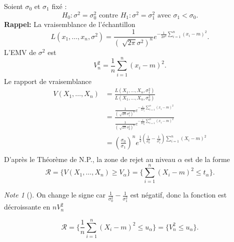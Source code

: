 \documentclass{article}
\theoremstyle{plain}%
\theoremstyle{definition}
\theoremstyle{remark}
\newtheorem*{note}{Note}
\begin{document}
Soient $ \sigma _0 $ et $ \sigma _1 $ fixé : 
\[
    H_0: \sigma ^2 = \sigma _0 ^2 \text{ contre } H_1 : \sigma ^2 = \sigma _1 ^2 \text{ avec } \sigma _1 < \sigma _0
.\]
\textbf{Rappel: }La vraisemblance de l'échantillon 
\[
    L(x_1, \dots, x_n, \sigma ^2) = \frac{1}{(\sqrt[]{2 \pi } \sigma ^2)^{n}} e^{- \frac{1}{2 \sigma ^2} \sum_{i=1}^{n}(x_i - m)^2}
.\]
L'EMV de $ \sigma ^2 $ est 
\[
    V_n^2 = \frac{1}{n}\sum_{i=1}^{n}(x_i - m)^2
.\]
Le rapport de vraisemblance 
\begin{align*}
    V(X_1, \dots, X_n) &= \frac{L(X_1, \dots, X_n, \sigma _1^2)}{L(X_1, ..., X_n, \sigma _0^2)} \\
    &= \frac{\frac{1}{(\sqrt[]{2 \pi } \sigma_1 ^2)^{n}} e^{- \frac{1}{2 \sigma_1 ^2} \sum_{i=1}^{n}(x_i - m)^2}}{\frac{1}{(\sqrt[]{2 \pi } \sigma_0 ^2)^{n}} e^{- \frac{1}{2 \sigma_0 ^2} \sum_{i=1}^{n}(x_i - m)^2}} \\ 
    &= (\frac{\sigma _0}{\sigma _1})^n e^{\frac{1}{2} (\frac{1}{\sigma ^2_0} - \frac{1}{\sigma _1^2}) \sum_{i=1}^{n}(X_i -m)^2} \\
\end{align*}
D'après le Théorème de N.P., la zone de rejet au niveau $ \alpha  $  est de la forme 
\[
    \mathcal{R} = \{V(X_1, \dots, X_n) \geq  V_\alpha \} = \{\sum_{i=1}^{n}(X_i - m)^2 \leq t_\alpha \}
.\]

\begin{note}[]
    On change le signe car $ \frac{1}{\sigma ^2_0} - \frac{1}{\sigma _1^2} $ est négatif, donc la fonction est décroissante en $ nV_n^2 $ 
\end{note}

\[
    \mathcal{R} = \{\frac{1}{n}\sum_{i=1}^{n}(X_i - m)^2 \leq u_\alpha \} = \{V_n^2 \leq u_\alpha \}
.\]
\end{document}
